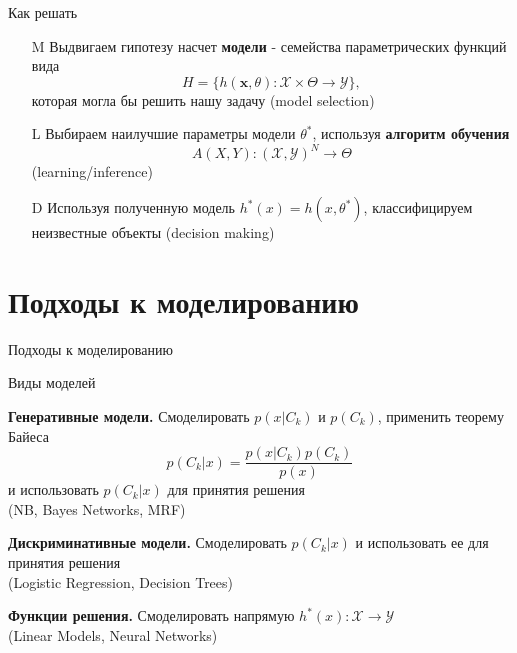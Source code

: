 \documentclass[10pt]{beamer}
\begin{document}
\begin{frame}{Как решать}

\begin{enumerate}

\item[M] Выдвигаем гипотезу насчет {\bf модели} - семейства параметрических функций вида
\[
H = \{h(\mathbf{x}, \theta): \mathcal{X} \times \Theta \rightarrow \mathcal{Y} \},
\]
которая могла бы решить нашу задачу (model selection)

\item[L] Выбираем наилучшие параметры модели $\theta^*$, используя {\bf алгоритм обучения}
\[
A(X, Y) : (\mathcal{X}, \mathcal{Y})^N \rightarrow \Theta
\]
(learning/inference)

\item[D] Используя полученную модель $h^*(x) = h(x, \theta^*)$, классифицируем неизвестные объекты (decision making)

\end{enumerate}

\end{frame}

\section{Подходы к моделированию}

\begin{frame}{}

\begin{center}
\Large Подходы к моделированию
\end{center}

\end{frame}

\begin{frame}{Виды моделей}

{\bf Генеративные модели.} Смоделировать $p(x | C_k)$ и $p(C_k)$, применить теорему Байеса
\[
p(C_k | x) = \frac{p(x | C_k) p(C_k)}{p(x)}
\]
и использовать $p(C_k | x)$ для принятия решения \\ (NB, Bayes Networks, MRF)
\vspace{1em}

{\bf Дискриминативные модели.} Смоделировать $p(C_k | x)$ и использовать ее для принятия решения \\ (Logistic Regression, Decision Trees)
\vspace{1em}

{\bf Функции решения.} Смоделировать напрямую $h^*(x): \mathcal{X} \rightarrow \mathcal{Y}$ \\ (Linear Models, Neural Networks)

\end{frame}
\end{document}
